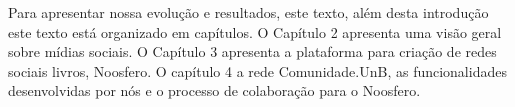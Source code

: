 Para apresentar nossa evolução e resultados, este texto, além desta introdução
este texto está organizado em capítulos. O Capítulo 2 apresenta uma visão geral
sobre mídias sociais. O Capítulo 3 apresenta
a plataforma para criação de redes sociais livros, Noosfero. O capítulo 4 a rede
Comunidade.UnB, as funcionalidades desenvolvidas por nós e o processo de
colaboração para o Noosfero.
